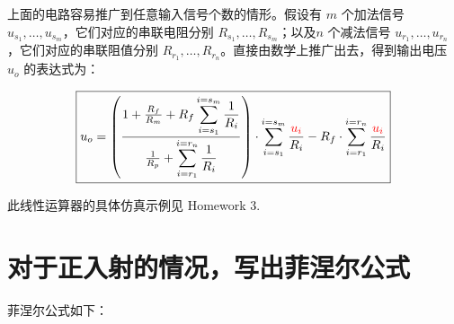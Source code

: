 \documentclass[a4paper]{article}  %
\theoremstyle{MyLineTheoremStyle} %
\theoremstyle{MyBlockTheoremStyle} %
\theoremstyle{MySubsubsectionStyle} %
\begin{document}
\begin{multicols*}{4}
上面的电路容易推广到任意输入信号个数的情形。假设有 $m$ 个加法信号 $u_{s_1}, \dots, u_{s_m}$，它们对应的串联电阻分别 $R_{s_1}, \dots, R_{s_m}$；以及$n$ 个减法信号 $u_{r_1}, \dots, u_{r_n}$，它们对应的串联阻值分别 $R_{r_1}, \dots, R_{r_n}$。直接由数学上推广出去，得到输出电压 
$u_o$ 的表达式为：

\begin{equation}
\boxed{
u_o = 
\left(
\frac{1 + \frac{R_f}{R_m} + \displaystyle R_f\sum_{i=s_1}^{i=s_m} \frac{1}{R_i}
}{
    \frac{1}{R_p} + \displaystyle \sum_{i=r_1}^{i=r_n} \frac{1}{R_i}
}
\right)\cdot \displaystyle\sum_{i=s_1}^{i=s_m} \frac{{\color{red} u_i}}{R_i}  - R_f \cdot  \displaystyle\sum_{i=r_1}^{i=r_n} \frac{{\color{red} u_i}}{R_i}
}
\end{equation}

此线性运算器的具体仿真示例见 Homework 3.

\section{对于正入射的情况，写出菲涅尔公式}

菲涅尔公式如下：

\begin{table}[H]
    \centering
    \renewcommand{\arraystretch}{1.5} %
\end{table}


\end{multicols*}
\end{document}

